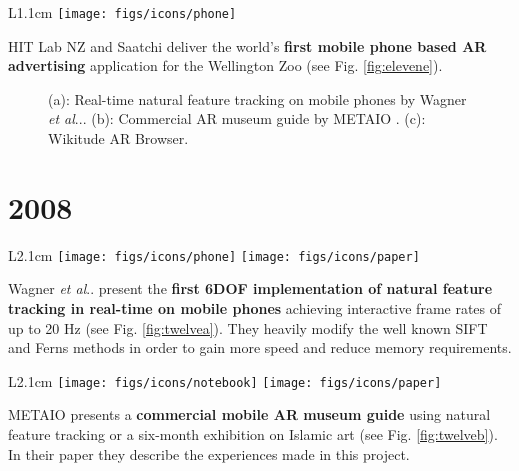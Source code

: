 \documentclass[12pt,a4paper]{article}
\makeatletter
\DeclareRobustCommand\onedot{\futurelet\@let@token\@onedot}
\def\@onedot{\ifx\@let@token.\else.\null\fi\xspace}
\def\etal{\emph{et al}\onedot}
\makeatother
\begin{document}
\vspace{0.1in}

\begin{wrapfigure}{L}{1.1cm}
	\vspace{-15pt}	
	\texttt{[image: figs/icons/phone]}
	\vspace{-20pt}		
\end{wrapfigure}
\noindent HIT Lab NZ and Saatchi deliver the world's \textbf{first mobile phone based AR advertising} application for the Wellington Zoo  (see Fig. \ref{fig:elevene}).

\begin{figure}[tbp]
\centering
\vspace{-50pt}
 \hfill
{} \hfill 
{}
\vspace{-10pt}
\caption{(a): Real-time natural feature tracking on mobile phones by Wagner \etal \cite{Wagner08}. (b): Commercial AR museum guide by METAIO \cite{Miyashita08}.  (c): Wikitude AR Browser.} \label{fig:twelve}
\end{figure}


\vspace{-5pt}
\section*{2008}

\begin{wrapfigure}{L}{2.1cm}
	\vspace{-15pt}	
	\texttt{[image: figs/icons/phone]}
	\texttt{[image: figs/icons/paper]}	
	\vspace{-25pt}		
\end{wrapfigure}
Wagner \etal present the \textbf{first 6DOF implementation of natural feature tracking in real-time on mobile phones} achieving interactive frame rates of up to 20 Hz \cite{Wagner08} (see Fig. \ref{fig:twelvea}). They heavily modify the well known SIFT and Ferns methods in order to gain more speed and reduce memory requirements.

\vspace{0.1in}


\begin{wrapfigure}{L}{2.1cm}
	\vspace{-10pt}	
	\texttt{[image: figs/icons/notebook]}
	\texttt{[image: figs/icons/paper]}	
	\vspace{-20pt}		
\end{wrapfigure}
\noindent METAIO presents a \textbf{commercial mobile AR museum guide} using natural feature tracking or a six-month exhibition on Islamic art \cite{Miyashita08} (see Fig. \ref{fig:twelveb}). In their paper they describe the experiences made in this project.
\end{document}
